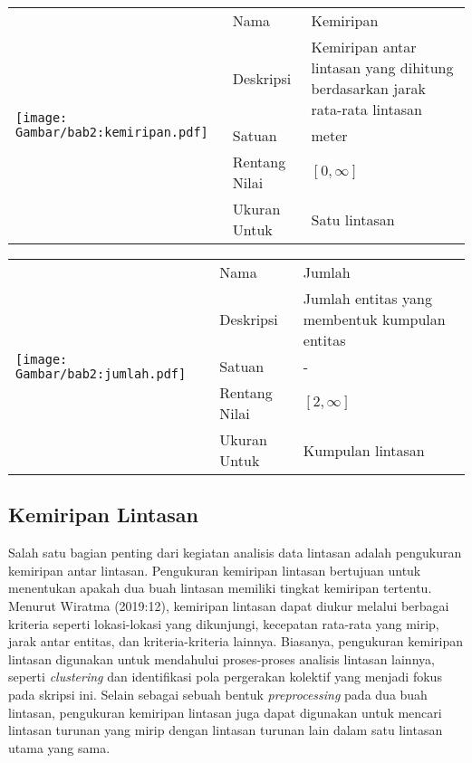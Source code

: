 \documentclass[a4paper,twoside]{article}
\begin{document}
\begin{table}[h!]
    \centering
    \begin{tabular}{|m{4cm}|l|p{8cm}|} 
        \hline
        \multirow{5}{*}{
            \texttt{[image: Gambar/bab2:kemiripan.pdf]}
        } & Nama & Kemiripan \\ 
        \cline{2-3}
        & Deskripsi & Kemiripan antar lintasan yang dihitung berdasarkan jarak rata-rata lintasan                     \\ 
        \cline{2-3}
        & Satuan & meter                   \\ 
        \cline{2-3}
        & Rentang Nilai & $[0, \infty]$                    \\ 
        \cline{2-3}
        & Ukuran Untuk & Satu lintasan                    \\
        \hline
    \end{tabular}
\end{table}

\begin{table}[h!]
    \centering
    \begin{tabular}{|m{4cm}|l|p{8cm}|} 
        \hline
        \multirow{5}{*}{
            \texttt{[image: Gambar/bab2:jumlah.pdf]}
        } & Nama & Jumlah \\ 
        \cline{2-3}
        & Deskripsi & Jumlah entitas yang membentuk kumpulan entitas                     \\ 
        \cline{2-3}
        & Satuan & -                   \\ 
        \cline{2-3}
        & Rentang Nilai & $[2, \infty]$                    \\ 
        \cline{2-3}
        & Ukuran Untuk & Kumpulan lintasan                    \\
        \hline
    \end{tabular}
\end{table}

\subsection{Kemiripan Lintasan}

Salah satu bagian penting dari kegiatan analisis data lintasan adalah pengukuran kemiripan antar lintasan. Pengukuran kemiripan lintasan bertujuan untuk menentukan apakah dua buah lintasan memiliki tingkat kemiripan tertentu. Menurut Wiratma (2019:12), kemiripan lintasan dapat diukur melalui berbagai kriteria seperti lokasi-lokasi yang dikunjungi, kecepatan rata-rata yang mirip, jarak antar entitas, dan kriteria-kriteria lainnya. Biasanya, pengukuran kemiripan lintasan digunakan untuk mendahului proses-proses analisis lintasan lainnya, seperti \textit{clustering} dan identifikasi pola pergerakan kolektif yang menjadi fokus pada skripsi ini. Selain sebagai sebuah bentuk \textit{preprocessing} pada dua buah lintasan, pengukuran kemiripan lintasan juga dapat digunakan untuk mencari lintasan turunan yang mirip dengan lintasan turunan lain dalam satu lintasan utama yang sama.
\end{document}
